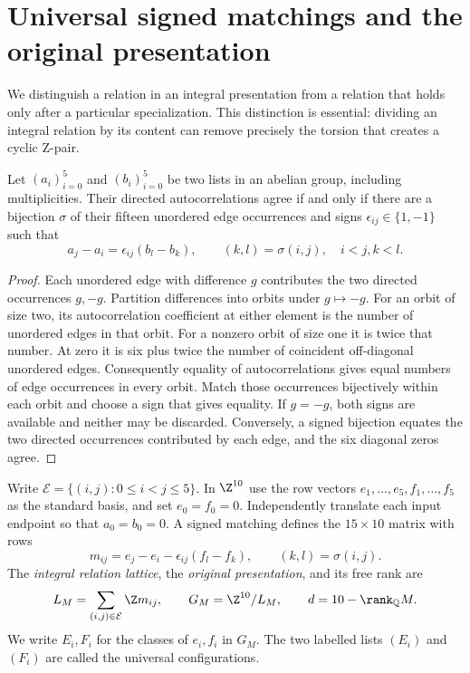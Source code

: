 \section{Universal signed matchings and the original presentation}
\label{sec:universal}

We distinguish a relation in an integral presentation from a relation that
holds only after a particular specialization. This distinction is essential:
dividing an integral relation by its content can remove precisely the torsion
that creates a cyclic Z-pair.

\begin{lemma}\label{lem:occurrence-matching}
Let $(a_i)_{i=0}^5$ and $(b_i)_{i=0}^5$ be two lists in an abelian group,
including multiplicities. Their directed autocorrelations agree if and only
if there are a bijection $\sigma$ of their fifteen unordered edge
occurrences and signs $\epsilon_{ij}\in\{1,-1\}$ such that
\[
 a_j-a_i=\epsilon_{ij}(b_l-b_k),\qquad
 (k,l)=\sigma(i,j),\quad i<j, k<l.
\]
\end{lemma}
\begin{proof}
Each unordered edge with difference $g$ contributes the two directed
occurrences $g,-g$. Partition differences into orbits under $g\mapsto-g$.
For an orbit of size two, its autocorrelation coefficient at either element
is the number of unordered edges in that orbit. For a nonzero orbit of size
one it is twice that number. At zero it is six plus twice the number of
coincident off-diagonal unordered edges. Consequently equality of
autocorrelations gives equal numbers of edge occurrences in every orbit.
Match those occurrences bijectively within each orbit and choose a sign
that gives equality. If $g=-g$, both signs are available and neither may be
discarded. Conversely, a signed bijection equates the two directed
occurrences contributed by each edge, and the six diagonal zeros agree.
\end{proof}

Write $\mathcal E=\{(i,j):0\le i<j\le5\}$. In $\Z^{10}$ use the row vectors
$e_1,\ldots,e_5,f_1,\ldots,f_5$ as the standard basis, and set
$e_0=f_0=0$. Independently translate each input endpoint so that
$a_0=b_0=0$. A signed matching defines the $15\times10$ matrix with rows
\begin{equation}\label{eq:formal-matching-row}
 m_{ij}=e_j-e_i-\epsilon_{ij}(f_l-f_k),\qquad(k,l)=\sigma(i,j).
\end{equation}
The \emph{integral relation lattice}, the \emph{original presentation},
and its free rank are
\begin{equation}\label{eq:original-presentation}
 L_M=\sum_{(i,j)\in\mathcal E}\Z m_{ij},\qquad
 G_M=\Z^{10}/L_M,\qquad d=10-\rank_{\mathbb Q}M.
\end{equation}
We write $E_i,F_i$ for the classes of $e_i,f_i$ in $G_M$. The two labelled
lists $(E_i)$ and $(F_i)$ are called the universal configurations.

